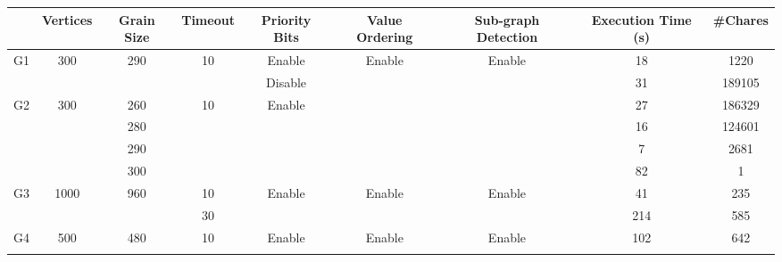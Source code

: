 \documentclass[10pt,oneside]{article}
\begin{document}
\begin{table}[h]
  \scalebox{0.8} {
    \begin{tabular}{|c|c|c|c|c|c|c|c|c|}
    \hline
                        & Vertices              & Grain Size           & Timeout             & Priority Bits           & Value Ordering          & Sub-graph Detection     & Execution Time (s) & \#Chares \\ \hline
    \multirow{2}{*}{G1} & \multirow{2}{*}{300}  & \multirow{2}{*}{290} & \multirow{2}{*}{10} & Enable                  & \multirow{2}{*}{Enable} & \multirow{2}{*}{Enable} & 18                 & 1220     \\ \cline{5-5} \cline{8-9} 
                        &                       &                      &                     & Disable                 &                         &                         & 31                 & 189105   \\ \hline
    \multirow{4}{*}{G2} & \multirow{4}{*}{300}  & 260                  & \multirow{4}{*}{10} & \multirow{4}{*}{Enable} & \multirow{4}{*}{}       & \multirow{4}{*}{}       & 27                 & 186329   \\ \cline{3-3} \cline{8-9} 
                        &                       & 280                  &                     &                         &                         &                         & 16                 & 124601   \\ \cline{3-3} \cline{8-9} 
                        &                       & 290                  &                     &                         &                         &                         & 7                  & 2681     \\ \cline{3-3} \cline{8-9} 
                        &                       & 300                  &                     &                         &                         &                         & 82                 & 1        \\ \hline
    \multirow{2}{*}{G3} & \multirow{2}{*}{1000} & \multirow{2}{*}{960} & 10                  & \multirow{2}{*}{Enable} & \multirow{2}{*}{Enable} & \multirow{2}{*}{Enable} & 41                 & 235      \\ \cline{4-4} \cline{8-9} 
                        &                       &                      & 30                  &                         &                         &                         & 214                & 585      \\ \hline
    \multirow{2}{*}{G4} & \multirow{2}{*}{500}  & \multirow{2}{*}{480} & \multirow{2}{*}{10} & \multirow{2}{*}{Enable} & Enable                  & \multirow{2}{*}{Enable} & 102                & 642      \\ \cline{6-6} \cline{8-9} 

\end{tabular}}
\end{table}
\end{document}
